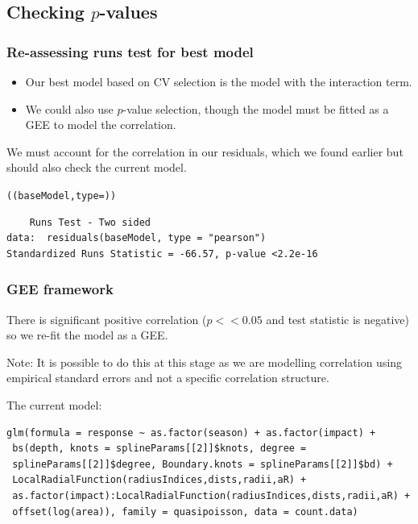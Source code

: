 
\subsection{Checking $p$-values}

\begin{frame}[fragile]
\frametitle{Re-assessing runs test for best model}
\begin{itemize}
\item Our best model based on CV selection is the model with the interaction term. 
\item We could also use $p$-value selection, though the model must be fitted as a GEE to model the correlation.
\end{itemize}

We must account for the correlation in our residuals, which we found earlier but should also check the current model.
\begin{knitrout}\footnotesize
{}\color{fgcolor}\begin{kframe}
\begin{alltt}
((baseModel, type = ))
\end{alltt}
\begin{verbatim}
	Runs Test - Two sided
data:  residuals(baseModel, type = "pearson") 
Standardized Runs Statistic = -66.57, p-value <2.2e-16
\end{verbatim}
\end{kframe}
\end{knitrout}


\end{frame}

\begin{frame}[fragile]
\frametitle{GEE framework}
There is significant positive correlation ($p<<0.05$ and test statistic is negative) so we re-fit the model as a GEE.

\bigskip
Note: It is possible to do this at this stage as we are modelling correlation using empirical standard errors and not a specific correlation structure.

\bigskip
\noindent The current model:
\footnotesize
\begin{verbatim}
glm(formula = response ~ as.factor(season) + as.factor(impact) + 
 bs(depth, knots = splineParams[[2]]$knots, degree = 
 splineParams[[2]]$degree, Boundary.knots = splineParams[[2]]$bd) + 
 LocalRadialFunction(radiusIndices,dists,radii,aR) + 
 as.factor(impact):LocalRadialFunction(radiusIndices,dists,radii,aR) +
 offset(log(area)), family = quasipoisson, data = count.data)
\end{verbatim}
\normalsize
\end{frame}

